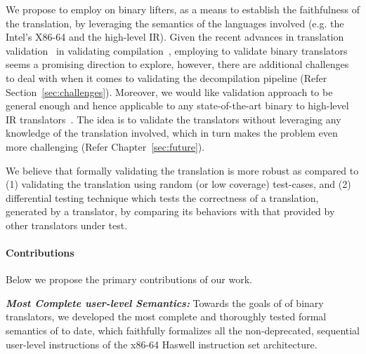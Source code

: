 We propose to employ \tv on binary lifters, as a means to establish the
faithfulness of the translation, by leveraging the semantics of the languages
involved (e.g. the Intel's X86-64 and the high-level IR).  Given the recent
advances in translation validation~\cite{Pnueli:1998} in validating
compilation~\cite{Necula:2000,Pnueli:1998,Stepp:2011,Tristan:2011,VOC2002,TVOC:CAV2005},
  employing \tv to validate binary translators seems a promising direction to
  explore,
  however, there are additional challenges to deal with when it comes to
  validating the decompilation pipeline (Refer Section~\ref{sec:challenges}).
  Moreover, we would like validation approach to be general enough and hence
  applicable to any state-of-the-art binary to high-level IR
  translators~\cite{McSema:Recon14,Remill,FCD,llvm-mctoll,BAP:CAV11,Angr1,DiFederico:CC2017}.
  The idea is to validate the translators without leveraging any knowledge of
  the translation involved, which in turn makes the problem even more
  challenging (Refer Chapter~\ref{sec:future}).

We believe that formally validating the translation is more robust as compared
to (1) validating the translation using random (or low coverage) test-cases,
   and (2) differential testing technique which tests the correctness of a
   translation, generated by a translator, by comparing its behaviors with that
   provided by other translators under test. 

\paragraph{Contributions}
Below we propose the  primary contributions of our work.

\textbf{\emph{Most Complete user-level \ISA Semantics:}} Towards the goals of
\tv of binary translators, we developed\cite{DasguptaAdve:PLDI19} the most
complete and thoroughly tested formal semantics of \ISA to date, which
faithfully formalizes all the non-deprecated, sequential user-level
instructions of the x86-64 Haswell instruction set architecture. 

